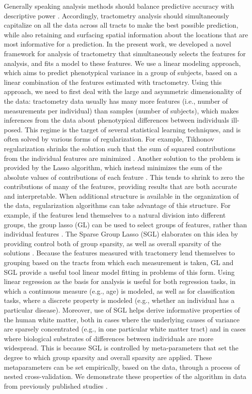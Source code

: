Generally speaking analysis methods should balance predictive accuracy with
descriptive power \cite{Murdoch2019-ax, Breiman2001-uz}. Accordingly,
tractometry analysis should simultaneously capitalize on all the data across all
tracts to make the best possible prediction, while also retaining and surfacing
spatial information about the locations that are most informative for a
prediction. In the present work, we developed a novel framework for analysis of
tractometry that simultaneously selects the features for analysis, and fits a
model to these features. We use a linear modeling approach, which aims to
predict phenotypical variance in a group of subjects, based on a linear
combination of the features estimated with tractometry. Using this approach, we
need to first deal with the large and asymmetric dimensionality of the data:
tractometry data usually has many more features (i.e., number of measurements
per individual) than samples (number of subjects), which makes inferences from
the data about phenotypical differences between individuals ill-posed. This
regime is the target of several statistical learning techniques, and is often
solved by various forms of regularization. For example, Tikhonov regularization
shrinks the solution such that the sum of squared contributions from the
individual features are minimized \cite{Hoerl2000-ij}. Another solution to the
problem is provided by the Lasso algorithm, which instead minimizes the sum of
the absolute values of contributions of each feature \cite{Tibshirani1996-qs}.
This tends to shrink to zero the contributions of many of the features,
providing results that are both accurate and interpretable. When additional
structure is available in the organization of the data, regularization
algorithms can take advantage of this structure. For example, if the features
lend themselves to a natural division into different groups, the group lasso
(GL) can be used to select groups of features, rather than individual features
\cite{Yuan2006-ky}. The Sparse Group Lasso (SGL) elaborates on this idea by
providing control both of group sparsity, as well as overall sparsity of the
solutions \cite{simon2013sgl}. Because the features measured with tractomery
lend themselves to grouping based on the tracts from which each measurement is
taken, GL and SGL provide a useful tool linear model fitting in problems of this
form. Using linear regression as the basis for analysis is useful for both
regression tasks, in which a continuous measure (e.g., age) is modeled, as well
as for classification tasks, where a discrete property is modeled (e.g., whether
an individual has a particular disease). Moreover, use of SGL helps derive
informative properties of the human white matter, both in cases where the
underlying causes of variance are sparsely concentrated (e.g., in one particular
white matter tract) and in cases where biological substrates of differences
between individuals are more widespread. This is because SGL is controlled by
meta-parameters that set the degree to which group sparsity and overall sparsity
are applied. These metaparameters can be set empirically, based on the data,
through a process of nested cross-validation. We demonstrate these properties of
the algorithm in data from previously published studies
\cite{sarica2017corticospinal, yeatman2014lifespan}.
